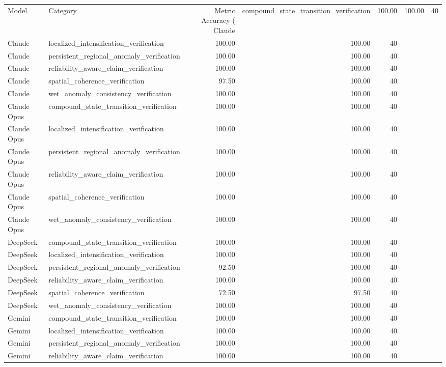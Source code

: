 \begin{tabular}{llrrr}
\toprule
Model & Category & Metric Accuracy (%
\midrule
Claude & compound_state_transition_verification & 100.00 & 100.00 & 40 \\
Claude & localized_intensification_verification & 100.00 & 100.00 & 40 \\
Claude & persistent_regional_anomaly_verification & 100.00 & 100.00 & 40 \\
Claude & reliability_aware_claim_verification & 100.00 & 100.00 & 40 \\
Claude & spatial_coherence_verification & 97.50 & 100.00 & 40 \\
Claude & wet_anomaly_consistency_verification & 100.00 & 100.00 & 40 \\
Claude Opus & compound_state_transition_verification & 100.00 & 100.00 & 40 \\
Claude Opus & localized_intensification_verification & 100.00 & 100.00 & 40 \\
Claude Opus & persistent_regional_anomaly_verification & 100.00 & 100.00 & 40 \\
Claude Opus & reliability_aware_claim_verification & 100.00 & 100.00 & 40 \\
Claude Opus & spatial_coherence_verification & 100.00 & 100.00 & 40 \\
Claude Opus & wet_anomaly_consistency_verification & 100.00 & 100.00 & 40 \\
DeepSeek & compound_state_transition_verification & 100.00 & 100.00 & 40 \\
DeepSeek & localized_intensification_verification & 100.00 & 100.00 & 40 \\
DeepSeek & persistent_regional_anomaly_verification & 92.50 & 100.00 & 40 \\
DeepSeek & reliability_aware_claim_verification & 100.00 & 100.00 & 40 \\
DeepSeek & spatial_coherence_verification & 72.50 & 97.50 & 40 \\
DeepSeek & wet_anomaly_consistency_verification & 100.00 & 100.00 & 40 \\
Gemini & compound_state_transition_verification & 100.00 & 100.00 & 40 \\
Gemini & localized_intensification_verification & 100.00 & 100.00 & 40 \\
Gemini & persistent_regional_anomaly_verification & 100.00 & 100.00 & 40 \\
Gemini & reliability_aware_claim_verification & 100.00 & 100.00 & 40 \\

\end{tabular}
